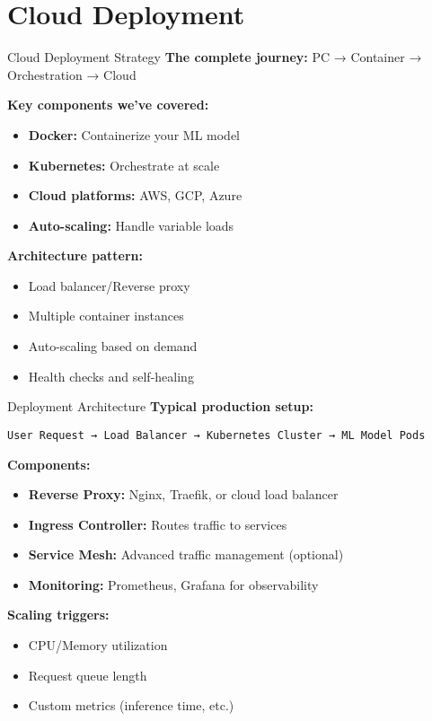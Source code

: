 \documentclass[../main.tex]{subfiles}
\begin{document}
\section{Cloud Deployment}

\begin{frame}{Cloud Deployment Strategy}
    \textbf{The complete journey:} PC → Container → Orchestration → Cloud

    \bigskip

    \textbf{Key components we've covered:}
    \begin{itemize}
        \item \textbf{Docker:} Containerize your ML model
        \item \textbf{Kubernetes:} Orchestrate at scale
        \item \textbf{Cloud platforms:} AWS, GCP, Azure
        \item \textbf{Auto-scaling:} Handle variable loads
    \end{itemize}

    \bigskip

    \textbf{Architecture pattern:}
    \begin{itemize}
        \item Load balancer/Reverse proxy
        \item Multiple container instances
        \item Auto-scaling based on demand
        \item Health checks and self-healing
    \end{itemize}
\end{frame}

\begin{frame}{Deployment Architecture}
    \textbf{Typical production setup:}

    \begin{center}
        \texttt{User Request → Load Balancer → Kubernetes Cluster → ML Model Pods}
    \end{center}

    \bigskip

    \textbf{Components:}
    \begin{itemize}
        \item \textbf{Reverse Proxy:} Nginx, Traefik, or cloud load balancer
        \item \textbf{Ingress Controller:} Routes traffic to services
        \item \textbf{Service Mesh:} Advanced traffic management (optional)
        \item \textbf{Monitoring:} Prometheus, Grafana for observability
    \end{itemize}

    \bigskip

    \textbf{Scaling triggers:}
    \begin{itemize}
        \item CPU/Memory utilization
        \item Request queue length
        \item Custom metrics (inference time, etc.)
    \end{itemize}
\end{frame}
\end{document}
